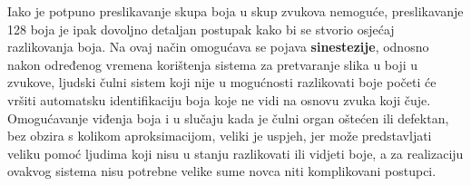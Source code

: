 \documentclass[12pt,a4paper]{article}
\begin{document}
Iako je potpuno preslikavanje skupa boja u skup zvukova nemoguće, preslikavanje 128 boja je ipak dovoljno detaljan postupak kako bi se stvorio osjećaj razlikovanja boja. Na ovaj način omogućava se pojava \textbf{sinestezije}, odnosno nakon određenog vremena korištenja sistema za pretvaranje slika u boji u zvukove, ljudski čulni sistem koji nije u mogućnosti razlikovati boje početi će vršiti automatsku identifikaciju boja koje ne vidi na osnovu zvuka koji čuje. Omogućavanje viđenja boja i u slučaju kada je čulni organ oštećen ili defektan, bez obzira s kolikom aproksimacijom, veliki je uspjeh, jer može predstavljati veliku pomoć ljudima koji nisu u stanju razlikovati ili vidjeti boje, a za realizaciju ovakvog sistema nisu potrebne velike sume novca niti komplikovani postupci.

\newpage



\end{document}
